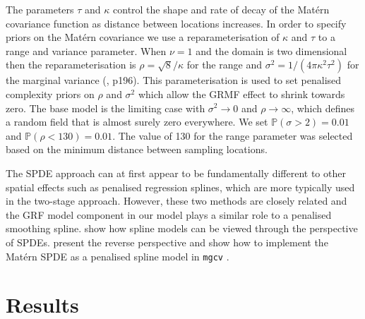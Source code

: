 \documentclass{statsoc}
\begin{document}
The parameters $\tau$ and $\kappa$ control the shape and rate of decay of the Mat\'ern covariance function as distance between locations increases.  In order to specify priors on the Mat\'ern covariance we use a reparameterisation of $\kappa$ and $\tau$ to a range and variance parameter.  When $\nu = 1$ and the domain is two dimensional then the reparameterisation is $\rho = \sqrt{8} / \kappa$ for the range and $\sigma^2 = 1 / (4\pi\kappa^2\tau^2)$ for the marginal variance (\cite{blangiardo_spatial_2013}, p196).  This parameterisation is used to set penalised complexity priors \citep{simpson_penalising_2017} on $\rho$ and $\sigma^2$ which allow the GRMF effect to shrink towards zero.  The base model is the limiting case with $\sigma^2 \rightarrow 0$ and $\rho \rightarrow \infty$, which defines a random field that is almost surely zero everywhere.  We set $\mathbb{P}(\sigma > 2) = 0.01$ and $\mathbb{P}(\rho < 130) = 0.01$.  The value of 130 for the range parameter was selected based on the minimum distance between sampling locations.  

The SPDE approach can at first appear to be fundamentally different to other spatial effects such as penalised regression splines, which are more typically used in the two-stage approach.  However, these two methods are closely related and the GRF model component in our model plays a similar role to a penalised smoothing spline.  \cite{yue_bayesian_2014} show how spline models can be viewed through the perspective of SPDEs. \cite{miller_UnderstandingStochasticPartial_2020} present the reverse perspective and show how to implement the Mat\'ern SPDE as a penalised spline model in \texttt{mgcv} \citep{wood_gam_2017}.

\section{Results}
\label{sec-results} 
\end{document}
